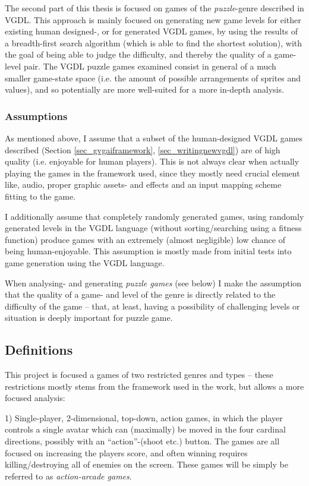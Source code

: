 \documentclass[a4paper,titlepage,final]{report}
\begin{document}
The second part of this thesis is focused on games of the \textit{puzzle}-genre described in VGDL.
This approach is mainly focused on generating new game levels for either existing human designed-, or for generated VGDL games, by using the results of a breadth-first search algorithm (which is able to find the shortest solution), with the goal of being able to judge the difficulty, and thereby the quality of a game-level pair.
The VGDL puzzle games examined consist in general of a much smaller game-state space (i.e. the amount of possible arrangements of sprites and values), and so potentially are more well-suited for a more in-depth analysis.


\subsubsection*{Assumptions}
As mentioned above, I assume that a subset of the human-designed VGDL games described (Section \ref{sec_gvgaiframework}, \ref{sec_writingnewvgdl}) are of high quality (i.e. enjoyable for human players). 
This is not always clear when actually playing the games in the framework used, since they mostly need crucial element like, audio, proper graphic assets- and effects and an input mapping scheme fitting to the game.

I additionally assume that completely randomly generated games, using randomly generated levels in the VGDL language (without sorting/searching using a fitness function) produce games with an extremely (almost negligible) low chance of being human-enjoyable.
This assumption is mostly made from initial tests into game generation using the VGDL language.

When analysing- and generating \textit{puzzle games} (see below) I make the assumption that the quality of a game- and level of the genre is directly related to the difficulty of the game -- that, at least, having a possibility of challenging levels or situation is deeply important for puzzle game.

\subsection{Definitions}
This project is focused a games of two restricted genres and types -- these restrictions mostly stems from the framework used in the work, but allows a more focused analysis: 

1) Single-player, 2-dimensional, top-down, action games, in which the player controls a single avatar which can (maximally) be moved in the four cardinal directions, possibly with an ``action''-(shoot etc.) button.
The games are all focused on increasing the players score, and often winning requires killing/destroying all of enemies on the screen.
These games will be simply be referred to as \textit{action-arcade games}.
\end{document}
